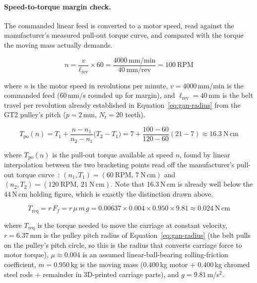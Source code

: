 \paragraph{Speed-to-torque margin check.}
\label{sec:gan-margin}
The commanded linear feed is converted to a motor speed, read against the manufacturer's measured pull-out torque curve, and compared with the torque the moving mass actually demands.

\begin{equation}
n = \frac{v}{\ell_{\mathrm{rev}}}\times 60 = \frac{4000\ \mathrm{mm/min}}{40\ \mathrm{mm/rev}} = 100\ \mathrm{RPM}
\label{eq:gan-rpm}
\end{equation}

where $n$ is the motor speed in revolutions per minute, $v=4000$\,mm/min is the commanded feed (60\,mm/s rounded up for margin), and $\ell_{\mathrm{rev}}=40$\,mm is the belt travel per revolution already established in Equation~\ref{eq:gan-radius} from the GT2 pulley's pitch ($p=2$\,mm, $N_t=20$ teeth).

\begin{equation}
T_{\mathrm{po}}(n) = T_1 + \frac{n-n_1}{n_2-n_1}\bigl(T_2-T_1\bigr) = 7 + \frac{100-60}{120-60}(21-7) \approx 16.3\ \mathrm{N\,cm}
\label{eq:gan-pullout}
\end{equation}

where $T_{\mathrm{po}}(n)$ is the pull-out torque available at speed $n$, found by linear interpolation between the two bracketing points read off the manufacturer's pull-out torque curve~\cite{stepperds}: $(n_1,T_1)=(60\ \mathrm{RPM},\,7\ \mathrm{N\,cm})$ and $(n_2,T_2)=(120\ \mathrm{RPM},\,21\ \mathrm{N\,cm})$. Note that 16.3\,N\,cm is already well below the 44\,N\,cm holding figure, which is exactly the distinction drawn above.

\begin{equation}
T_{\mathrm{req}} = r\,F_f = r\,\mu\,m\,g = 0.00637 \times 0.004 \times 0.950 \times 9.81 \approx 0.024\ \mathrm{N\,cm}
\label{eq:gan-treq}
\end{equation}

where $T_{\mathrm{req}}$ is the torque needed to move the carriage at constant velocity, $r=6.37$\,mm is the pulley pitch radius of Equation~\ref{eq:gan-radius} (the belt pulls on the pulley's pitch circle, so this is the radius that converts carriage force to motor torque), $\mu\approx0.004$ is an assumed linear-ball-bearing rolling-friction coefficient, $m=0.950$\,kg is the moving mass (0.400\,kg motor + 0.400\,kg chromed steel rods + remainder in 3D-printed carriage parts), and $g=9.81$\,m/s$^2$.


